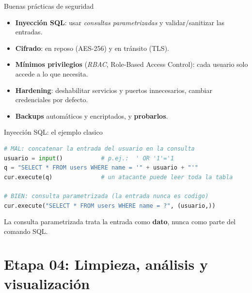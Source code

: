 \documentclass[aspectratio=169]{beamer}
\begin{document}
\begin{frame}{Buenas pr\'acticas de seguridad}
  \begin{itemize}
    \item \textbf{Inyecci\'on SQL}: usar \emph{consultas parametrizadas} y
          validar/sanitizar las entradas.
    \item \textbf{Cifrado}: en reposo (AES-256) y en tr\'ansito (TLS).
    \item \textbf{M\'inimos privilegios} (\emph{RBAC}, Role-Based Access
          Control): cada usuario solo accede a lo que necesita.
    \item \textbf{Hardening}: deshabilitar servicios y puertos innecesarios,
          cambiar credenciales por defecto.
    \item \textbf{Backups} autom\'aticos y encriptados, y \textbf{probarlos}.
  \end{itemize}
\end{frame}

\begin{frame}[fragile]{Inyecci\'on SQL: el ejemplo clasico}
\begin{lstlisting}[language=Python, basicstyle=\ttfamily\scriptsize]
# MAL: concatenar la entrada del usuario en la consulta
usuario = input()           # p.ej.:  ' OR '1'='1
q = "SELECT * FROM users WHERE name = '" + usuario + "'"
cur.execute(q)              # un atacante puede leer toda la tabla

# BIEN: consulta parametrizada (la entrada nunca es codigo)
cur.execute("SELECT * FROM users WHERE name = ?", (usuario,))
\end{lstlisting}
  La consulta parametrizada trata la entrada como \textbf{dato}, nunca como
  parte del comando SQL.
\end{frame}

\section{Etapa 04: Limpieza, an\'alisis y visualizaci\'on}
\end{document}
